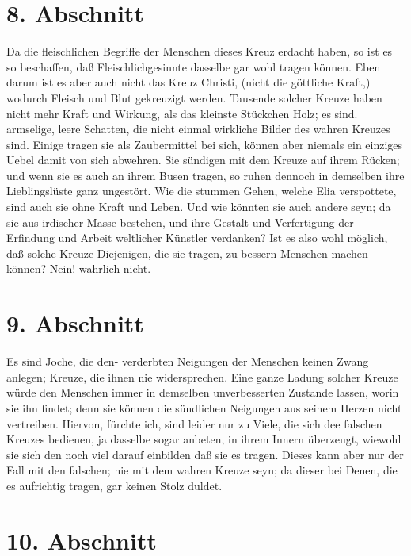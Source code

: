 \section{8. Abschnitt}

Da die fleischlichen Begriffe der Menschen dieses Kreuz erdacht haben, so ist es so beschaffen, daß Fleischlichgesinnte dasselbe gar wohl tragen können. Eben darum ist es aber auch nicht das Kreuz Christi, (nicht die göttliche Kraft,) wodurch Fleisch und Blut gekreuzigt werden. Tausende solcher Kreuze haben nicht mehr Kraft und Wirkung, als das kleinste Stückchen Holz; es sind. armselige, leere Schatten, die nicht einmal wirkliche Bilder des wahren Kreuzes sind. Einige tragen sie als Zaubermittel bei sich, können aber niemals ein einziges Uebel damit von sich abwehren. Sie sündigen mit dem Kreuze auf ihrem Rücken; und wenn sie es auch an ihrem Busen tragen, so ruhen dennoch in demselben ihre Lieblingslüste ganz ungestört. Wie die stummen Gehen, welche Elia verspottete, sind auch sie ohne Kraft und Leben. Und wie könnten sie auch andere seyn; da sie aus irdischer Masse bestehen, und ihre Gestalt und Verfertigung der Erfindung und Arbeit weltlicher Künstler verdanken? Ist es also wohl möglich, daß solche Kreuze Diejenigen, die sie tragen, zu bessern Menschen machen können? Nein! wahrlich nicht.

\section{9. Abschnitt}

Es sind Joche, die den- verderbten Neigungen der Menschen keinen Zwang anlegen; Kreuze, die ihnen nie widersprechen. Eine ganze Ladung solcher Kreuze würde den Menschen immer in demselben unverbesserten Zustande lassen, worin sie ihn findet; denn sie können die sündlichen Neigungen aus seinem Herzen nicht vertreiben. Hiervon, fürchte ich, sind leider nur zu Viele, die sich dee falschen Kreuzes bedienen, ja dasselbe sogar anbeten, in ihrem Innern überzeugt, wiewohl sie sich den noch viel darauf einbilden daß sie es tragen. Dieses kann aber nur der Fall mit den falschen; nie mit dem wahren Kreuze seyn; da dieser bei Denen, die es aufrichtig tragen, gar keinen Stolz duldet.

\section{10. Abschnitt}

